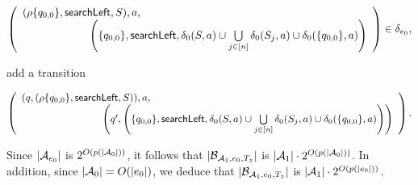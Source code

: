 \begin{enumerate}
\begin{itemize}
\medskip

		$\left(
		\begin{array}{l l}
		(\rho \{q_{0,0}\}, \searchleft, S), a, &\\
		& \hspace{-2cm} \left(\{q_{0,0}\}, \searchleft, \delta_0(S,a) \cup \bigcup \limits_{j \in [n]} \delta_0(S_j, a) \cup \delta_0(\{q_{0,0}\}, a) \right)
		\end{array}
		\right) \in \delta_{e_0},$

\medskip

add a transition

\medskip
		$\left(
		\begin{array}{l l}
		(q, (\rho \{q_{0,0}\}, \searchleft, S)), a, &\\
		& \hspace{-2cm} \left(q', \left(\{q_{0,0}\}, \searchleft, \delta_0(S,a) \cup \bigcup \limits_{j \in [n]} \delta_0(S_j, a) \cup \delta_0(\{q_{0,0}\}, a) \right)\right)
		\end{array}
		\right).$
\medskip

\end{itemize}
\end{enumerate}
Since $|\mathcal{A}_{e_0}|$ is $2^{O(p(|\mathcal{A}_0|))}$, it follows that $|\mathcal{B}_{\mathcal{A}_1, e_0, T_z}|$ is $|\mathcal{A}_1| \cdot 2^{O(p(|\mathcal{A}_0|))}$. In addition, since $|\mathcal{A}_0|=O(|e_0|)$, we deduce that $|\mathcal{B}_{\mathcal{A}_1, e_0, T_z}|$ is $|\mathcal{A}_1| \cdot 2^{O(p(|e_0|))}$.

